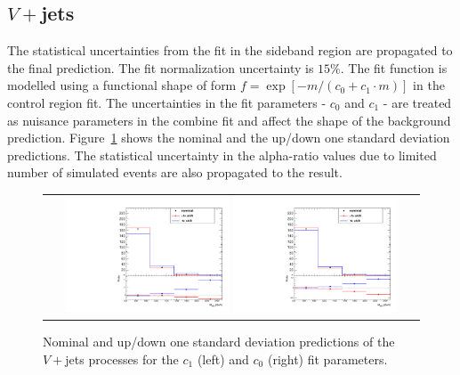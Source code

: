 \subsection{$V+$jets}
The statistical uncertainties from the fit in the sideband region are propagated to the final prediction. The fit normalization uncertainty is $15\%$. The fit function is modelled using a functional shape of form $f=\exp\left[-m/(c_{0}+c_1\cdot m)\right]$ in the control region fit. The uncertainties in the fit parameters - $c_{0}$ and $c_{1}$ - are treated as nuisance parameters in the combine fit and affect the shape of the background prediction. Figure~\ref{fig:wjet} shows the nominal and the up/down one standard deviation predictions. The statistical uncertainty in the alpha-ratio values due to limited number of simulated events are also propagated to the result. 
%
\begin{figure}[!htbp]
  \begin{center}
    \begin{tabular}{c}
    \includegraphics[width=0.45\textwidth]{Plots/systematic/WjetFitSyst_Par0_Wjets.pdf}%
    \includegraphics[width=0.45\textwidth]{Plots/systematic/WjetFitSyst_Par1_Wjets.pdf}%
    \end{tabular}
    \caption{Nominal and up/down one standard deviation predictions of the $V+$jets processes for the $c_{1}$ (left) and $c_{0}$ (right) fit parameters.}
    \label{fig:wjet}
  \end{center}
\end{figure}

